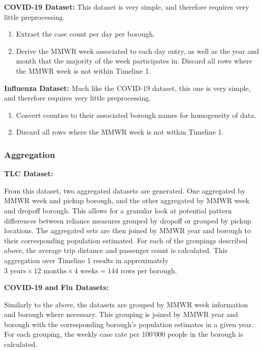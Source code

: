\documentclass[11pt]{article}
\begin{document}
\textbf{COVID-19 Dataset:}
This dataset is very simple, and therefore requires very little preprocessing.
    \begin{enumerate}
        \item Extract the case count per day per borough.
        \item Derive the MMWR week associated to each day entry, as well as the year and month that the majority of the week participates in.
        Discard all rows where the MMWR week is not within Timeline 1.
    \end{enumerate}

\textbf{Influenza Dataset:}
Much like the COVID-19 dataset, this one is very simple, and therefore requires very little preprocessing.
    \begin{enumerate}
        \item Convert counties to their associated borough names for homogeneity of data.
        \item Discard all rows where the MMWR week is not within Timeline 1.
    \end{enumerate}

\subsubsection{Aggregation}

\textbf{TLC Dataset:}

From this dataset, two aggregated datasets are generated.
One aggregated by MMWR week and pickup borough, and the other aggregated by MMWR week and dropoff borough.
This allows for a granular look at potential pattern differences between reliance measures grouped by dropoff or grouped by pickup locations.
The aggregated sets are then joined by MMWR year and borough to their corresponding population estimated.
For each of the groupings described above, 
the average trip distance and passenger count is calculated.
This aggregation over Timeline 1 results in approximately $3 \text{ years} \times 12 \text{ months} \times 4 \text{ weeks} = 144 \text{ rows per borough}$.

\textbf{COVID-19 and Flu Datasets:}

Similarly to the above, the datasets are grouped by MMWR week information and borough where necessary.
This grouping is joined by MMWR year and borough with the corresponding borough's population estimates in a given year.
For each grouping, the weekly case rate per 100'000 people in the borough is calculated.
\end{document}
